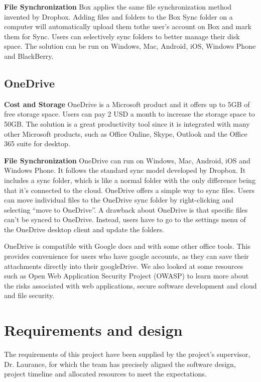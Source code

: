 \documentclass{article}
\begin{document}
\hfill \break
\textbf{File Synchronization}
Box applies the same file synchronization method invented by Dropbox. Adding files and folders to the Box Sync folder on a computer will automatically upload them tothe user's account on Box and mark them for Sync. Users can selectively sync folders to better manage their disk space. The solution can be run on Windows, Mac, Android, iOS, Windows Phone and BlackBerry.

\subsection{OneDrive}
\textbf{Cost and Storage}
OneDrive is a Microsoft product and it offers up to 5GB of free storage space. Users can pay 2 USD a month to increase the storage space to 50GB. The solution is a great productivity tool since it is integrated with many other Microsoft products, such as Office Online, Skype, Outlook and the Office 365 suite for desktop.

\hfill \break
\textbf{File Synchronization}
OneDrive can run on Windows, Mac, Android, iOS and Windows Phone. It follows the standard sync model developed by Dropbox. It includes a sync folder, which is like a normal folder with the only difference being that it's connected to the cloud. OneDrive offers a simple way to sync files. Users can move individual files to the OneDrive sync folder by right-clicking and selecting “move to OneDrive”. A drawback about OneDrive is that specific files can’t be synced to OneDrive. Instead, users have to go to the settings menu of the OneDrive desktop client and update the folders.

OneDrive is compatible with Google docs and with some other office tools. This provides convenience for users who have google accounts, as they can save their attachments directly into their googleDrive.
\newline
\hfill \break
We also looked at some resources such as Open Web Application Security Project (OWASP) to learn more about the risks associated with web applications, secure software development and cloud and file security.

\section{Requirements and design}
The requirements of this project have been supplied by the project's supervisor, Dr. Laurance, for which the team has precisely aligned the software design, project timeline and allocated resources to meet the expectations.
\end{document}
